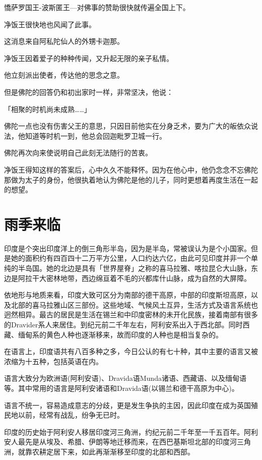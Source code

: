 \documentclass[twoside,openany]{book}
\begin{document}
憍萨罗国王-波斯匿王—对佛事的赞助很快就传遍全国上下。

净饭王很快地也风闻了此事。

这消息来自阿私陀仙人的外甥卡迦那。

净饭王因着爱子的种种传闻，又升起无限的亲子私情。

他立刻派出使者，传达他的思念之意。

但是佛陀的回答仍和初出家时一样，非常坚决，他说：

「相聚的时机尚未成熟……」

佛陀一点也没有伤害父王的意思，只因目前他实在分身乏术，要为广大的皈依众说法，他知道等时机一到，他总会回迦毗罗卫城一行。

佛陀再次向来使说明自己此刻无法随行的苦衷。

净饭王得知这样的答案后，心中久久不能释怀。因为在他心中，他仍念念不忘佛陀那做为太子的身份，他很执着地认为佛陀是他的儿子，同时更想着再度生活在一起的想望。

\section{雨季来临}\label{sec6.2}

印度是个突出印度洋上的倒三角形半岛，因为是半岛，常被误认为是个小国家。但是她的面积约有四百四十二万平方公里，人口约达六亿，由此可见印度并非一个单纯的半岛国。她的北边是具有「世界屋脊」之称的喜马拉雅、喀拉昆仑大山脉，东边是阿拉干大密林地带，西边绵亘着不毛的兴都库什山脉，成为自然的大屏障。

依地形与地质来看，印度大致可区分为南部的德干高原，中部的印度斯坦高原，以及北部的喜马拉雅山区三部份。这些地域、气候风土互异，生活方式及语言系统也迥然相异。最古的居民是生活在锡兰和中印度密林的未开化民族，接着南部有很多的Dravider系人来居住。到纪元前二千年左右，阿利安系出入于西北部。同时西藏、缅甸系的黄色人种也逐渐移来，故而印度的人种也是相当复杂的。

在语言上，印度语共有八百多种之多，今日公认的有七十种，其中主要的语言又被浓缩为十五种，包括英语在内。

语言大致分为欧洲语(阿利安语)、Dravida语Munda诸语、西藏语、以及缅甸语等。其中常用的语言是阿利安诸语和Dravida语(以锡兰和德干高原为中心)。

语言不统一，容易造成意志的分歧，更是发生争执的主因，因此印度在成为英国殖民地以前，经常有战乱，纷争无已时。

印度的历史始于阿利安人移居印度河三角洲，约纪元前二千年至一千五百年。阿利安人最先是从埃及、希腊、伊朗等地迁移而来，在西巴基斯坦北部的印度河三角洲，就靠农耕定居下来，如此再渐渐移至印度的北部和西部。
\end{document}
